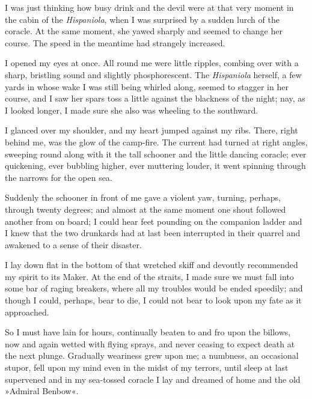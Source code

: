 I was just thinking how busy drink and the devil were at that very moment in the cabin of the \textit{Hispaniola}, when I was surprised by a sudden lurch of the coracle. At the same moment, she yawed sharply and seemed to change her course. The speed in the meantime had strangely increased.

I opened my eyes at once. All round me were little ripples, combing over with a sharp, bristling sound and slightly phosphorescent. The \textit{Hispaniola} herself, a few yards in whose wake I was still being whirled along, seemed to stagger in her course, and I saw her spars toss a little against the blackness of the night; nay, as I looked longer, I made sure she also was wheeling to the southward.

I glanced over my shoulder, and my heart jumped against my ribs. There, right behind me, was the glow of the camp-fire. The current had turned at right angles, sweeping round along with it the tall schooner and the little dancing coracle; ever quickening, ever bubbling higher, ever muttering louder, it went spinning through the narrows for the open sea.

Suddenly the schooner in front of me gave a violent yaw, turning, perhaps, through twenty degrees; and almost at the same moment one shout followed another from on board; I could hear feet pounding on the companion ladder and I knew that the two drunkards had at last been interrupted in their quarrel and awakened to a sense of their disaster.

I lay down flat in the bottom of that wretched skiff and devoutly recommended my spirit to its Maker. At the end of the straits, I made sure we must fall into some bar of raging breakers, where all my troubles would be ended speedily; and though I could, perhaps, bear to die, I could not bear to look upon my fate as it approached.

So I must have lain for hours, continually beaten to and fro upon the billows, now and again wetted with flying sprays, and never ceasing to expect death at the next plunge. Gradually weariness grew upon me; a numbness, an occasional stupor, fell upon my mind even in the midst of my terrors, until sleep at last supervened and in my sea-tossed coracle I lay and dreamed of home and the old »Admiral Benbow«.